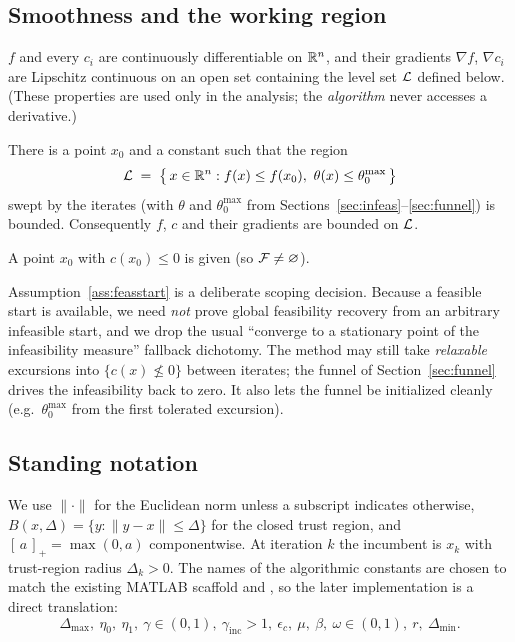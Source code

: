 \subsection{Smoothness and the working region}

\begin{assumption}[Smoothness]
  \label{ass:smooth}
  $f$ and every $c_i$ are continuously differentiable on $\mathbb{R}^{n}$, and their
  gradients $\nabla f$, $\nabla c_i$ are Lipschitz continuous on an open set
  containing the level set $\mathcal{L}$ defined below. (These properties are used only
  in the analysis; the \emph{algorithm} never accesses a derivative.)
\end{assumption}

\begin{assumption}
  \label{ass:levelset}
  There is a point $x_0$ and a constant such that the region
  \[
    \Lset \;=\; \bigl\{\, x\in\Rn : f(x)\le f(x_0),\ \theta(x)\le\theta_0^{\max}\,\bigr\}
  \]
  swept by the iterates (with $\theta$ and $\theta_0^{\max}$ from
  Sections~\ref{sec:infeas}--\ref{sec:funnel}) is bounded. Consequently $f$, $c$
  and their gradients are bounded on $\mathcal{L}$.
\end{assumption}

\begin{assumption}
  \label{ass:feasstart}
  A point $x_0$ with $c(x_0)\le 0$ is given (so $\mathcal{F}\ne\varnothing$).
\end{assumption}

Assumption~\ref{ass:feasstart} is a deliberate scoping decision. Because a
feasible start is available, we need \emph{not} prove global feasibility recovery
from an arbitrary infeasible start, and we drop the usual ``converge to a
stationary point of the infeasibility measure'' fallback dichotomy. The method
may still take \emph{relaxable} excursions into $\{c(x)\not\le0\}$ between
iterates; the funnel of Section~\ref{sec:funnel} drives the infeasibility back to
zero. It also lets the funnel be initialized cleanly (e.g.\ $\theta_0^{\max}$
from the first tolerated excursion).

\subsection{Standing notation}

We use $\|\cdot\|$ for the Euclidean norm unless a subscript indicates otherwise,
$B(x,\Delta)=\{y:\|y-x\|\le\Delta\}$ for the closed trust region, and
$[\,a\,]_+=\max(0,a)$ componentwise. At iteration $k$ the incumbent is $x_k$ with
trust-region radius $\Delta_k>0$. The names of the algorithmic constants are
chosen to match the existing MATLAB scaffold 
and , so the later implementation is a direct
translation:
\[
  \Delta_{\max},\ \eta_0,\ \eta_1,\ \gamma\in(0,1),\ \gamma_{\text{inc}}>1,\
  \epsilon_c,\ \mu,\ \beta,\ \omega\in(0,1),\ r,\ \Delta_{\min}.
\]

